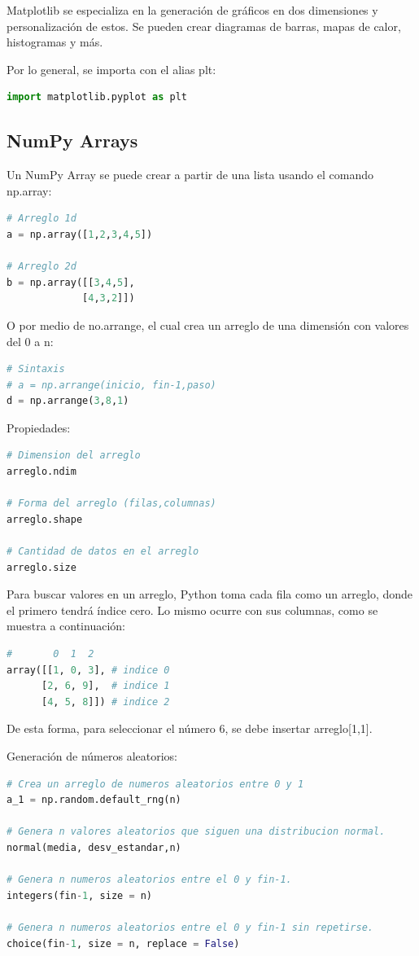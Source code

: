 \documentclass[a4paper, 12pt]{book}
\begin{document}
Matplotlib se especializa en la generación de gráficos en dos dimensiones y personalización de estos. Se pueden crear diagramas de barras, mapas de calor, histogramas y más.

Por lo general, se importa con el alias plt:
\begin{lstlisting}[language=Python]
import matplotlib.pyplot as plt
\end{lstlisting}

\subsection{NumPy Arrays}
Un NumPy Array se puede crear a partir de una lista usando el comando np.array:
\begin{lstlisting}[language=Python]
# Arreglo 1d
a = np.array([1,2,3,4,5])

# Arreglo 2d
b = np.array([[3,4,5],
			 [4,3,2]])
\end{lstlisting}
O por medio de no.arrange, el cual crea un arreglo de una dimensión con valores del 0 a n:
\begin{lstlisting}[language=Python]
# Sintaxis
# a = np.arrange(inicio, fin-1,paso)
d = np.arrange(3,8,1)
\end{lstlisting}

Propiedades:
\begin{lstlisting}[language=Python]
# Dimension del arreglo
arreglo.ndim
	
# Forma del arreglo (filas,columnas)
arreglo.shape
	
# Cantidad de datos en el arreglo
arreglo.size
\end{lstlisting}

Para buscar valores en un arreglo, Python toma cada fila como un arreglo, donde el primero tendrá índice cero. Lo mismo ocurre con sus columnas, como se muestra a continuación:
\begin{lstlisting}[language=Python]
#       0  1  2
array([[1, 0, 3], # indice 0
      [2, 6, 9],  # indice 1
      [4, 5, 8]]) # indice 2
\end{lstlisting}
De esta forma, para seleccionar el número 6, se debe insertar arreglo[1,1].


Generación de números aleatorios:
\begin{lstlisting}[language=Python]
# Crea un arreglo de numeros aleatorios entre 0 y 1
a_1 = np.random.default_rng(n)
	
# Genera n valores aleatorios que siguen una distribucion normal.
normal(media, desv_estandar,n)
	
# Genera n numeros aleatorios entre el 0 y fin-1.
integers(fin-1, size = n)
	
# Genera n numeros aleatorios entre el 0 y fin-1 sin repetirse.
choice(fin-1, size = n, replace = False)
\end{lstlisting}
\end{document}
